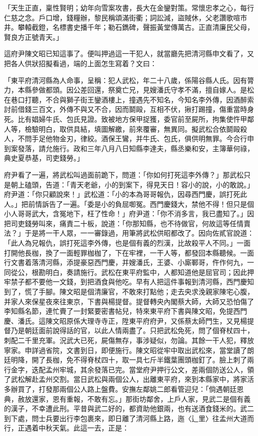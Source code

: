 「天生正直，稟性賢明；幼年向雪案攻書，長大在金鑾對策。常懷忠孝之心，每行仁慈之念。戶口增，錢糧辦，黎民稱頌滿街衢；詞訟減，盜賊休，父老讚歌喧市井。攀轅截鐙，名標書史播千年；勒石鐫碑，聲振黃堂傳萬古。正直清廉民父母，賢良方正號青天。」

這府尹陳文昭已知這事了。便叫押過這一干犯人，就當廳先把清河縣申文看了，又把各人供狀招擬看過，端的上面怎生寫着？文曰：

「東平府清河縣為人命事，呈稱：犯人武松，年二十八歲，係陽谷縣人氏。因有膂力，本縣參做都頭。因公差回還，祭奠亡兄，見嫂潘氏守孝不滿，擅自嫁人。是松在巷口打聽，不合與獅子街王鑾酒樓上，撞遇先不知名，今知名李外傳，因酒醉索討前借錢三百文，外傳不與又不合，因而鬬毆，互相不伏，揪打踢撞，傷重當時身死。比有娼婦牛氏、包氏見證。致被地方保甲捉獲，委官前至屍所，拘集使忤甲鄰人等，檢驗明白，取供具結，填圖解繳，前來覆審，無異同。擬武松合依鬬毆殺人，不問手足他物金刃，律絞。酒保王鸞，并牛氏、包氏，俱供明無罪。今合行申到案發落，請允施行。政和三年八月八日知縣李達夫，縣丞樂和安，主簿華何祿，典史夏恭基，司吏錢勞。」

府尹看了一遍，將武松叫過面前跪下，問道：「你如何打死這李外傳？」那武松只是朝上磕頭，告道：「青天老爺，小的到案下，得見天日！容小的說，小的敢說。」府尹道：「你只顧說來！」武松道：「小的本為哥哥報仇，因尋西門慶，誤打死此人。」把前情訴告了一遍。「委是小的負屈啣冤。西門慶錢大，禁他不得！但只是個小人哥哥武大，含冤地下，枉了性命！」府尹道：「你不消多言，我已盡知了。」因把司吏錢勞叫來，痛責二十板，說道：「你那知縣，也不待做官，何故這等任情賣法？」于是將一干人眾，一一審錄過，用筆將武松供昭都改了。因向佐貳官說道：「此人為兄報仇，誤打死這李外傳，也是個有義的烈漢，比故殺平人不同。」一面打開他長枷，換了一面輕罪枷枷了，下在牢裡，一干人等，都發回本縣聽候。一面行文書着落清河縣，添提豪惡西門慶，并嫂潘氏，王婆、小廝鄆哥，仵作何九，一同從公，根勘明白，奏請施行。武松在東平府監中，人都知道他是屈官司；因此押牢禁子都不要他一文錢，到把酒食與他吃。早有人把這件事報到清河縣，西門慶知到了，慌了手腳。陳文昭是個清廉官，不敢來打點他；走去央求浼親家陳宅心腹，并家人來保星夜來往東京，下書與楊提督。提督轉央內閣蔡大師，大師又恐怕傷了李知縣名節，連忙賷了一封緊要密書帖兒，特來東平府下書與陳文昭，免提西門慶、潘氏。這陳文昭原係大理寺寺正，陞東平府府尹，又係蔡太師門生，又見楊提督乃是朝廷面前說得話的官，以此人情兩盡了。只把武松免死，問了個脊杖四十，刺配二千里充軍。況武大已死，屍傷無存，事涉疑似，勿論。其餘一干人犯，釋放寧家。申詳過省院，文書到日，即便施行。陳文昭從牢中取出武松來，當堂讀了朗廷明降，開了長枷，免不得脊杖四十，取一具七斤半鐵葉團頭枷釘了。臉上刺了兩行金字，迭配孟州牢城，其余發落已完。當堂府尹押行公文，差兩個防送公人，領了武松解赴孟州交割。當日武松與兩個公人，出離東平府，來到本縣家中，將家活多辦買了，打發那兩個公人路上盤費。安撫左鄰姚二郎看管迎兒：「倘遇朝廷恩典，赦放還家，恩有重報，不敢有忘。」那街坊鄰舍，上戶人家，見武二是個有義的漢子，不幸遭此刑。平昔與武二好的，都資助他銀兩，也有送酒食錢米的。武二到下處，問士兵要出行李包裹來，即日離了清河縣上路，迤〈辶里〉往孟州大道而行，正遇着中秋天氣。此這一去，正是：

